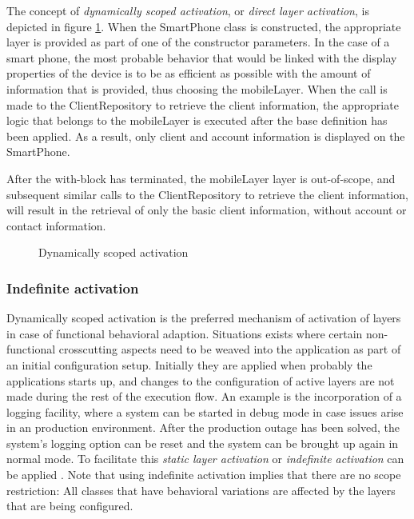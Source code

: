 \documentclass{acm_proc_article-sp}
\begin{document}
The concept of \textit{dynamically scoped activation}, or \textit{direct layer activation}, is depicted in figure \ref{fig:dynamically_scoped_activation}. When the SmartPhone class is constructed, the appropriate layer is provided as part of one of the constructor parameters. In the case of a smart phone, the most probable behavior that would be linked with the display properties of the device is to be as efficient as possible with the amount of information that is provided, thus choosing the mobileLayer. When the call is made to the ClientRepository to retrieve the client information, the appropriate logic that belongs to the mobileLayer is executed after the base definition has been applied. As a result, only client and account information is displayed on the SmartPhone. 
\newpage

After the with-block has terminated, the mobileLayer layer is out-of-scope, and subsequent similar calls to the ClientRepository to retrieve the client information, will result in the retrieval of only the basic client information, without account or contact information.

\begin{figure}[H]
\centering
{}
\caption{Dynamically scoped activation}
\label{fig:dynamically_scoped_activation}
\end{figure}

\subsubsection{Indefinite activation}
\label{indefinite_activation}
Dynamically scoped activation is the preferred mechanism of activation of layers in case of functional behavioral adaption. Situations exists where certain non-functional crosscutting aspects need to be weaved into the application as part of an initial configuration setup. Initially they are applied when probably the applications starts up, and changes to the configuration of active layers are not made during the rest of the execution flow. An example is the incorporation of a logging facility, where a system can be started in debug mode in case issues arise in an production environment. After the production outage has been solved, the system's logging option can be reset and the system can be brought up again in normal mode. To facilitate this \textit{static layer activation} or \textit{indefinite activation} can be applied  \cite{SALVANESCHI20121801}. Note that using indefinite activation implies that there are no scope restriction: All classes that have behavioral variations are affected by the layers that are being configured. 
\end{document}
